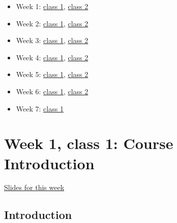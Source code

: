 \documentclass[
]{book}
\begin{document}
\begin{itemize}
\item
  Week 1: \href{https://comhis.github.io/applying-network-analysis-to-humanities/slides/1-1-introduction.html}{class
  1},
  \href{https://comhis.github.io/applying-network-analysis-to-humanities/slides/1-2-intro-to-r.html}{class
  2}
\item
  Week 2: \href{https://comhis.github.io/applying-network-analysis-to-humanities/slides/2-1-acquiring-networks.html}{class
  1},
  \href{https://comhis.github.io/applying-network-analysis-to-humanities/slides/2-2-data-harmonisation.html}{class
  2}
\item
  Week 3: \href{https://comhis.github.io/applying-network-analysis-to-humanities/slides/3-1-data-modeling.html}{class
  1},
  \href{https://comhis.github.io/applying-network-analysis-to-humanities/slides/3-2-relational-data.html}{class
  2}
\item
  Week 4: \href{https://comhis.github.io/applying-network-analysis-to-humanities/slides/4-1-fundamentals.html}{class
  1},
  \href{https://comhis.github.io/applying-network-analysis-to-humanities/slides/4-2-networks-with-r.html}{class
  2}
\item
  Week 5: \href{https://comhis.github.io/applying-network-analysis-to-humanities/slides/5-1-visualising-with-ggraph.html}{class
  1},
  \href{https://comhis.github.io/applying-network-analysis-to-humanities/slides/visualising-gephi.html}{class
  2}
\item
  Week 6: \href{https://comhis.github.io/applying-network-analysis-to-humanities/slides/bipartite-networks.html}{class
  1},
  \href{https://comhis.github.io/applying-network-analysis-to-humanities/slides/6-2-literary-linguistic.html}{class
  2}
\item
  Week 7: \href{https://comhis.github.io/applying-network-analysis-to-humanities/slides/7-reflections.html}{class
  1}
\end{itemize}

\hypertarget{week-1-class-1-course-introduction}{%
\chapter{Week 1, class 1: Course Introduction}\label{week-1-class-1-course-introduction}}

\href{https://comhis.github.io/applying-network-analysis-to-humanities/slides/1-1-introduction.html\#/title-slide}{Slides for this week}

\hypertarget{introduction}{%
\section{Introduction}\label{introduction}}
\end{document}
